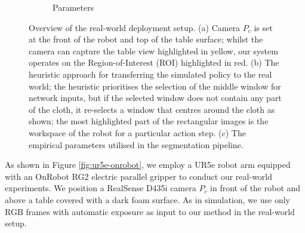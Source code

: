 \documentclass[journal]{IEEEtran}
\newif\ifshowrev\showrevtrue
\newcommand{\rev}[1]{\ifshowrev\textcolor{revblue}{#1}\else#1\fi}
\begin{document}
\begin{figure}[t!]
\begin{subfigure}[b]{0.24\linewidth}
        \label{fig:setup_c}
        \vspace{0.5em} %
        \caption{Parameters \label{tab:seg-para}}
    \end{subfigure}
    
    \caption{Overview of the real-world deployment setup. \rev{(a) Camera $P_c$ is set at the front of the robot and top of the table surface; whilst the camera can capture the table view highlighted in yellow, our system operates on the Region-of-Interest (ROI) highlighted in red. (b) The heuristic approach for transferring the simulated policy to the real world; the heuristic prioritises the selection of the middle window for network inputs, but if the selected window does not contain any part of the cloth, it re-selects a window that centres around the cloth as shown; the most highlighted part of the rectangular images is the workspace of the \text{UR5e} robot for a particular action step.} (c) The empirical parameters utilised in the segmentation pipeline.}
    \label{fig:real-world-overview}
\end{figure}
As shown in Figure \ref{fig:ur5e-onrobot}, we employ a UR5e robot arm equipped with an OnRobot RG2 electric parallel gripper to conduct our real-world experiments. We position a RealSense D435i camera $P_c$ in front of the robot and above a table covered with a dark foam surface. As in simulation, we use only RGB frames with automatic exposure as input to our method in the real-world setup.
\end{document}
